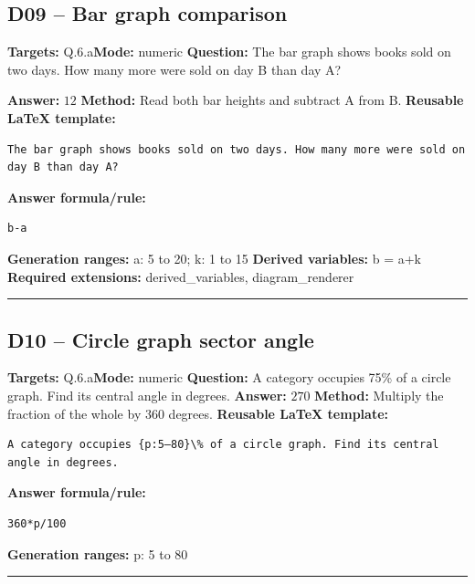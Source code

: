 \documentclass[11pt]{article}
\begin{document}
\subsection{D09 -- Bar graph comparison}
\textbf{Targets:} Q.6.a\quad\textbf{Mode:} numeric
\textbf{Question:} The bar graph shows books sold on two days. How many more were sold on day B than day A?
\begin{center}\end{center}
\textbf{Answer:} \(12\)
\textbf{Method:} Read both bar heights and subtract A from B.
\textbf{Reusable LaTeX template:}
\begin{verbatim}
The bar graph shows books sold on two days. How many more were sold on day B than day A?
\end{verbatim}
\textbf{Answer formula/rule:}
\begin{verbatim}
b-a
\end{verbatim}
\textbf{Generation ranges:} a: 5 to 20; k: 1 to 15
\textbf{Derived variables:} b = a+k
\textbf{Required extensions:} derived\_variables, diagram\_renderer
\medskip\hrule\medskip
\subsection{D10 -- Circle graph sector angle}
\textbf{Targets:} Q.6.a\quad\textbf{Mode:} numeric
\textbf{Question:} A category occupies 75\% of a circle graph. Find its central angle in degrees.
\textbf{Answer:} \(270\)
\textbf{Method:} Multiply the fraction of the whole by 360 degrees.
\textbf{Reusable LaTeX template:}
\begin{verbatim}
A category occupies {p:5–80}\% of a circle graph. Find its central angle in degrees.
\end{verbatim}
\textbf{Answer formula/rule:}
\begin{verbatim}
360*p/100
\end{verbatim}
\textbf{Generation ranges:} p: 5 to 80
\medskip\hrule\medskip
\end{document}
